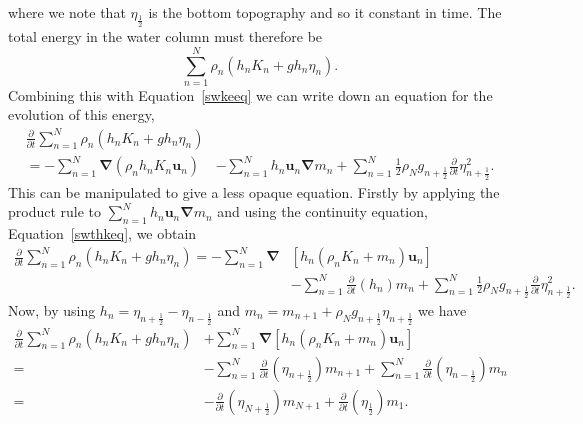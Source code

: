 \documentclass[12pt,a4paper]{report}
\newcommand*\equref[1]{Equation~\eqref{#1}}
\newcommand*{\half}{\frac{1}{2}}
\begin{document}
    where we 
    note that $\eta_{\half }$ is the bottom topography and so it constant
    in time. The total energy in the
    water column must therefore be 
    \begin{equation*}
    \sum_{n=1}^{N} \rho_{n}\left(h_{n} K_{n}+ g h_{n}\eta_{n}\right).
    \end{equation*}
     Combining this with \equref{swkeeq} we
    can write down an equation for the evolution of this energy,
        \begin{equation}
        \begin{split}
        \frac{\partial}{\partial t}\sum_{n=1}^{N} \rho_{n}\left(h_{n} K_{n}+ g h_{n}\eta_{n}\right)& \\
        = -\sum_{n=1}^{N} \boldsymbol{\nabla} \left(\rho_{n} h_{n} K_{n} \boldsymbol{u}_{n}\right)& 
        -\sum_{n=1}^{N}  h_{n} \boldsymbol{u}_{n}  \boldsymbol{\nabla} m_{n}
        +\sum_{n=1}^{N}\half  \rho_{N} g_{n+\half } \frac{\partial}{\partial t}\eta_{n+\half }^{2} .
        \end{split}
        \end{equation}
        This can be manipulated to give a less opaque equation.
        Firstly by applying the product rule to $\sum_{n=1}^{N}  h_{n} \boldsymbol{u}_{n}  \boldsymbol{\nabla} m_{n}$ and using
        the continuity equation, \equref{swthkeq}, we obtain
            \begin{equation}
            \begin{split}
            \frac{\partial}{\partial t}\sum_{n=1}^{N} \rho_{n}\left(h_{n} K_{n}+ g h_{n}\eta_{n}\right) 
            = -\sum_{n=1}^{N} \boldsymbol{\nabla} &\left[h_{n}  \left(\rho_{n}K_{n}+ m_{n}\right) \boldsymbol{u}_{n}\right]  \\
            &-\sum_{n=1}^{N} \frac{\partial}{\partial t}\left(h_{n}\right)   m_{n}
            +\sum_{n=1}^{N}\half  \rho_{N} g_{n+\half } \frac{\partial}{\partial t}\eta_{n+\half }^{2}.
            \end{split}
            \end{equation}
          Now, by using  $h_{n} = \eta_{n+\half }-\eta_{n-\half }$
          and $m_{n} = m_{n+1} +  \rho_{N}g_{n+\half } \eta_{n+\half }$
          we have 
    \begin{equation}
    \begin{split}
    \frac{\partial}{\partial t}\sum_{n=1}^{N} \rho_{n}\left(h_{n} K_{n}+ g h_{n}\eta_{n}\right) &+\sum_{n=1}^{N} \boldsymbol{\nabla} \left[h_{n} \left(\rho_{n}K_{n}+m_{n}\right) \boldsymbol{u}_{n}\right] \\
    =&-\sum_{n=1}^{N} \frac{\partial}{\partial t}\left(\eta_{n+\half }\right)    m_{n+1} +\sum_{n=1}^{N} \frac{\partial}{\partial t}\left(\eta_{n-\half }\right) m_{n}\\
    =&- \frac{\partial}{\partial t}\left(\eta_{N+\half }\right)    m_{N+1} + \frac{\partial}{\partial t}\left(\eta_{\half }\right) m_{1}.
    \end{split}
    \end{equation}
\end{document}
